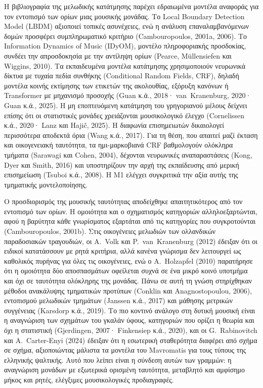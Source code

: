 \documentclass[a4paper]{article}
\begin{document}
Η βιβλιογραφία της μελωδικής κατάτμησης παρέχει εδραιωμένα μοντέλα αναφοράς για τον εντοπισμό των ορίων μιας μουσικής μονάδας. Το Local Boundary Detection Model (LBDM) αξιοποιεί τοπικές ασυνέχειες, ενώ η ανάλυση επαναλαμβανόμενων δομών προσφέρει συμπληρωματικό κριτήριο (Cambouropoulos, 2001a, 2006). Το Information Dynamics of Music (IDyOM), μοντέλο πληροφοριακής προσδοκίας, συνδέει την απροσδοκησία με την αντίληψη ορίων (Pearce, Müllensiefen και Wiggins, 2010). Τα εκπαιδευμένα μοντέλα κατάτμησης χρησιμοποιούν νευρωνικά δίκτυα με τυχαία πεδία συνθήκης (Conditional Random Fields, CRF), δηλαδή μοντέλα κοινής εκτίμησης των ετικετών της ακολουθίας, εξόρυξη κανόνων ή Transformer με μηχανισμό προσοχής (Guan κ.ά., 2018· van~Kranenburg, 2020· Guan κ.ά., 2025). Η μη εποπτευόμενη κατάτμηση του γρηγοριανού μέλους δείχνει επίσης ότι οι στατιστικές μονάδες χρειάζονται μουσικολογικό έλεγχο (Cornelissen κ.ά., 2020· Lanz και Hajič, 2025). Η διαφωνία επισημειωτών δικαιολογεί περισσότερα αποδεκτά όρια (Wang κ.ά., 2017). Για τη θέση, που απαιτεί μαζί έκταση και οικογενειακή ταυτότητα, τα ημι-μαρκοβιανά CRF βαθμολογούν ολόκληρα τμήματα (Sarawagi και Cohen, 2004), δέχονται νευρωνικές αναπαραστάσεις (Kong, Dyer και Smith, 2016) και υποστηρίζουν την αρχή της εκπαίδευσης από μερική επισημείωση (Tsuboi κ.ά., 2008). Η Μ1 ελέγχει συγκριτικά την αξία αυτής της τμηματικής μοντελοποίησης.

Ο προσδιορισμός της μουσικής ταυτότητας αποδείχθηκε απαιτητικότερος από τον εντοπισμό των ορίων. Η ομοιότητα και ο σχηματισμός κατηγοριών αλληλο\-εξαρτώνται, αφού η βαρύτητα κάθε γνωρίσματος εξαρτάται από τις κατηγορίες που συγκροτούνται (Cambouropoulos, 2001b). Στις οικογένειες μελωδιών των ολλανδικών παραδοσιακών τραγουδιών, οι A.~Volk και P.~van~Kranenburg (2012) έδειξαν ότι οι ειδικοί κατατάσσουν με ρητά κριτήρια, αλλά κανένα γνώρισμα δεν λειτουργεί ως καθολικός πυρήνας για όλες τις οικογένειες, ενώ ο A.~Holzapfel (2010) παρατήρησε ότι η ομοιότητα δύο αποσπασμάτων οφείλεται συχνά σε ένα μικρό κοινό υποτμήμα και όχι σε ταυτότητα ολόκληρης της μονάδας. Πάνω σε αυτή τη γνώση στηρίχθηκαν μέθοδοι ανακάλυψης τμηματικών προτύπων (Conklin και Anagnostopoulou, 2006), εντοπισμού μελωδικών τμημάτων (Janssen κ.ά., 2017) και μάθησης μετρικών συγγένειας (Karsdorp κ.ά., 2019). Το πιο κοντινό ανάλογο στη δυτική μουσική είναι η αναγνώριση των σχημάτων του γκαλάν ύφους, κατηγοριών που ορίζει η θεωρία και όχι η στατιστική (Gjerdingen, 2007· Finkensiep κ.ά., 2020), και οι G.~Rabinovitch και A.~Carter-Enyi (2024) έδειξαν ότι η εσωτερική σταθερότητα διαφέρει από σχήμα σε σχήμα, αξιοποιώντας μάλιστα τα μοντέλα του Mavromatis για τους τύπους της ελληνικής ψαλτικής. Αυτό που λείπει είναι η σύνδεση αυτών των γραμμών: η αναγνώριση μονάδων με εξωτερικά ορισμένη ταυτότητα, μεταβλητό και αμφίσημο μήκος και ρητές, ελέγξιμες μουσικολογικές προδιαγραφές.
\end{document}
